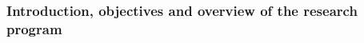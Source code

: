 


\subsubsection{Introduction, objectives and overview of the research program}
\label{sec:introRO}


